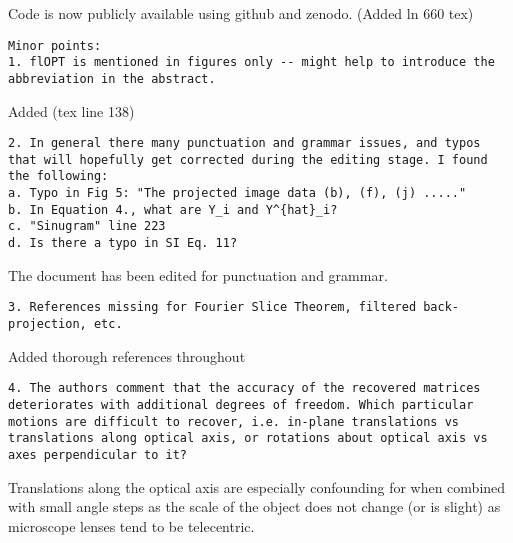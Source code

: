 \documentclass[12pt]{report}
\begin{document}
Code is now publicly available using github and zenodo. (Added ln 660 tex)

\begin{lstlisting}
Minor points:
1. flOPT is mentioned in figures only -- might help to introduce the abbreviation in the abstract.
\end{lstlisting}

Added (tex line 138)

\begin{lstlisting}
2. In general there many punctuation and grammar issues, and typos that will hopefully get corrected during the editing stage. I found the following:
a. Typo in Fig 5: "The projected image data (b), (f), (j) ....."
b. In Equation 4., what are Y_i and Y^{hat}_i?
c. "Sinugram" line 223
d. Is there a typo in SI Eq. 11?
\end{lstlisting}

The document has been edited for punctuation and grammar.

\begin{lstlisting}
3. References missing for Fourier Slice Theorem, filtered back-projection, etc.
\end{lstlisting}

Added thorough references throughout

\begin{lstlisting}
4. The authors comment that the accuracy of the recovered matrices deteriorates with additional degrees of freedom. Which particular motions are difficult to recover, i.e. in-plane translations vs translations along optical axis, or rotations about optical axis vs axes perpendicular to it?
\end{lstlisting}
Translations along the optical axis are especially confounding for when combined with small angle steps as the scale of the object does not change (or is slight) as microscope lenses tend to be telecentric.
\end{document}
